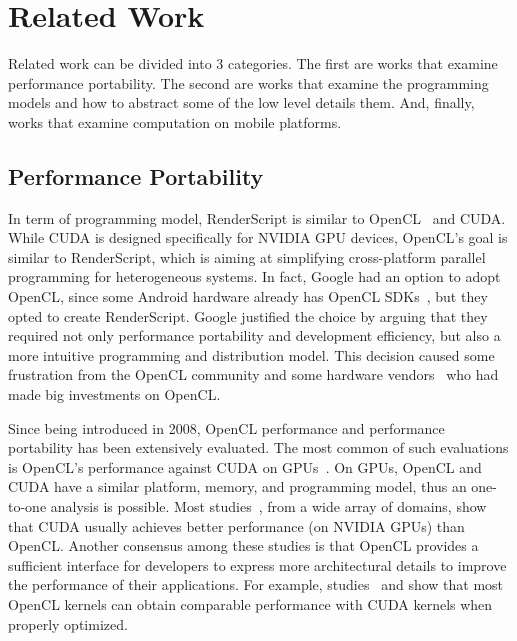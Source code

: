 \section{Related Work}
\label{sec:related}

Related work can be divided into $3$ categories.
The first are works that examine performance portability.
The second are works that examine the programming models and how to abstract some of the low level details them.
And, finally, works that examine computation on mobile platforms.

\subsection{Performance Portability}


In term of programming model, RenderScript is similar to OpenCL~\cite{OpenCL}
and CUDA. While CUDA is designed specifically for NVIDIA GPU devices, OpenCL's
goal is similar to RenderScript, which is aiming at simplifying cross-platform
parallel programming for heterogeneous systems.  In fact, Google had an option
to adopt OpenCL, since some Android hardware already has OpenCL
SDKs~\cite{OpenCL:Android}, but they opted to create RenderScript.  Google
justified the choice by arguing that they required not only performance
portability and development efficiency, but also a more intuitive programming
and distribution model.  This decision caused some frustration from the OpenCL
community \cite{androidblockopenCL} and some hardware
vendors~\cite{googlelockin} who had made big investments on OpenCL.

Since being introduced in 2008, OpenCL performance and performance portability
has been extensively evaluated.  The most common of such evaluations is OpenCL's
performance against CUDA on GPUs~\cite{fang2011comprehensive,
weber2011comparing, van2011correlating, vassilev2010comparison,
amorim2009comparing, karimi2010performance, komatsu2010evaluating}.  On
GPUs, OpenCL and CUDA have a similar platform, memory, and programming model,
thus an one-to-one analysis is possible.  Most studies~\cite{weber2011comparing,
van2011correlating, vassilev2010comparison, amorim2009comparing}, from a wide
array of domains, show that CUDA usually achieves better performance (on NVIDIA
GPUs) than OpenCL.  Another consensus among these studies is that OpenCL
provides a sufficient interface for developers to express more architectural
details to improve the performance of their applications.  For example,
studies~\cite{komatsu2010evaluating} and \cite{fang2011comprehensive} show that
most OpenCL kernels can obtain comparable performance with CUDA kernels when
properly optimized.


